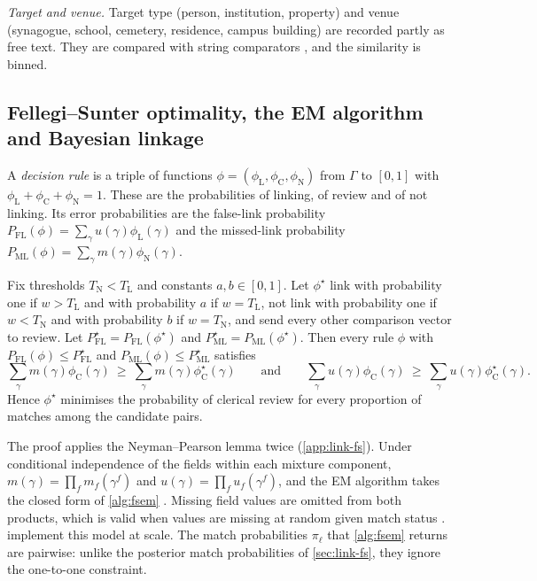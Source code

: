 \emph{Target and venue.} Target type (person, institution, property) and venue (synagogue, school, cemetery, residence, campus building) are recorded partly as free text. They are compared with string comparators \citep{winkler1990}, and the similarity is binned.

\subsection{Fellegi--Sunter optimality, the EM algorithm and Bayesian linkage}\label{app:link-fsdetails}

A \emph{decision rule} is a triple of functions $\phi=(\phi_{\mathrm L},\phi_{\mathrm C},\phi_{\mathrm N})$ from $\Gamma$ to $[0,1]$ with $\phi_{\mathrm L}+\phi_{\mathrm C}+\phi_{\mathrm N}=1$. These are the probabilities of linking, of review and of not linking. Its error probabilities are the false-link probability $P_{\mathrm{FL}}(\phi)=\sum_\gamma u(\gamma)\phi_{\mathrm L}(\gamma)$ and the missed-link probability $P_{\mathrm{ML}}(\phi)=\sum_\gamma m(\gamma)\phi_{\mathrm N}(\gamma)$.

\begin{proposition}\label{prop:link-fs}
Fix thresholds $T_{\mathrm N}<T_{\mathrm L}$ and constants $a,b\in[0,1]$. Let $\phi^\star$ link with probability one if $w>T_{\mathrm L}$ and with probability $a$ if $w=T_{\mathrm L}$, not link with probability one if $w<T_{\mathrm N}$ and with probability $b$ if $w=T_{\mathrm N}$, and send every other comparison vector to review. Let $P_{\mathrm{FL}}^\star=P_{\mathrm{FL}}(\phi^\star)$ and $P_{\mathrm{ML}}^\star=P_{\mathrm{ML}}(\phi^\star)$. Then every rule $\phi$ with $P_{\mathrm{FL}}(\phi)\le P_{\mathrm{FL}}^\star$ and $P_{\mathrm{ML}}(\phi)\le P_{\mathrm{ML}}^\star$ satisfies
\[
  \textstyle\sum_\gamma m(\gamma)\phi_{\mathrm C}(\gamma)\ \ge\ \sum_\gamma m(\gamma)\phi^\star_{\mathrm C}(\gamma)
  \qquad\text{and}\qquad
  \sum_\gamma u(\gamma)\phi_{\mathrm C}(\gamma)\ \ge\ \sum_\gamma u(\gamma)\phi^\star_{\mathrm C}(\gamma).
\]
Hence $\phi^\star$ minimises the probability of clerical review for every proportion of matches among the candidate pairs.
\end{proposition}

The proof applies the Neyman--Pearson lemma twice (\cref{app:link-fs}). Under conditional independence of the fields within each mixture component, $m(\gamma)=\prod_fm_f(\gamma^f)$ and $u(\gamma)=\prod_fu_f(\gamma^f)$, and the EM algorithm takes the closed form of \cref{alg:fsem} \citep{winkler1988,jaro1989}. Missing field values are omitted from both products, which is valid when values are missing at random given match status \citep{enamorado2019}.  implement this model at scale. The match probabilities $\pi_\ell$ that \cref{alg:fsem} returns are pairwise: unlike the posterior match probabilities of \cref{sec:link-fs}, they ignore the one-to-one constraint.

